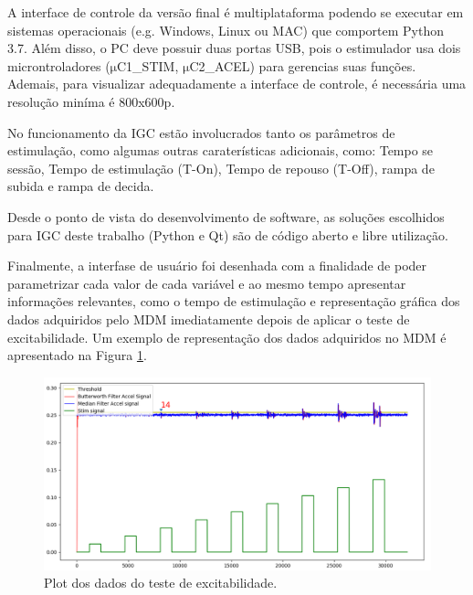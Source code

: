 A interface de controle da versão final é multiplataforma podendo se executar em sistemas operacionais (e.g. Windows, Linux ou MAC) que comportem Python 3.7. Além disso, o \acrshort{PC} deve possuir duas portas USB, pois o estimulador usa dois microntroladores ($\mathrm{\mu}$C1\_STIM, $\mathrm{\mu}$C2\_ACEL) para gerencias suas funções. Ademais, para visualizar adequadamente a interface de controle, é necessária uma resolução miníma é 800x600p.

No funcionamento da \acrshort{IGC} estão involucrados tanto os parâmetros de estimulação, como algumas outras caraterísticas adicionais, como: Tempo se sessão, Tempo de estimulação (T-On), Tempo de repouso (T-Off), rampa de subida e rampa de decida.

Desde o ponto de vista do desenvolvimento de software, as soluções escolhidos para \acrshort{IGC} deste trabalho (Python e Qt) são de código aberto e libre utilização.

Finalmente, a interfase de usuário foi desenhada com a finalidade de poder parametrizar cada valor de cada variável e ao mesmo tempo apresentar informações relevantes, como o tempo de estimulação e representação gráfica dos dados adquiridos pelo \acrshort{MDM} imediatamente depois de aplicar o teste de excitabilidade. Um exemplo de representação dos dados adquiridos no \acrshort{MDM}  é apresentado na Figura \ref{fig:c4_f31_xte}.

\begin{figure}
    \centering %
    \includegraphics[width=1\linewidth]{figs/Fig_c4/c4_f31_xte}
    \caption{Plot dos dados do teste de excitabilidade.}
    \label{fig:c4_f31_xte}
\end{figure}
